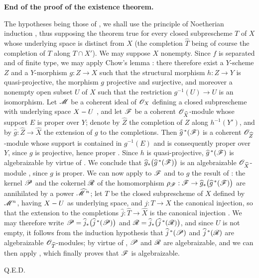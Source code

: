 \begin{env}[5.3.5]
\label{III.5.3.5}
\textbf{End of the proof of the existence theorem.}

The hypotheses being those of , we shall use the
principle of Noetherian induction , thus supposing
the theorem true for every closed subprescheme $T$ of $X$ whose
underlying space is distinct from $X$ (the completion $\widehat{T}$
being of course the completion of $T$ along $T\cap X'$).  We may
suppose $X$ nonempty.  Since $f$ is separated and of finite type, we
may apply Chow's lemma : there therefore exist a
$Y$-scheme $Z$ and a $Y$-morphism $g:Z\to X$ such that the structural
morphism $h:Z\to Y$ is quasi-projective, the morphism $g$ projective
and surjective, and moreover a nonempty open subset $U$ of $X$ such
that the restriction $g^{-1}(U)\to U$ is an isomorphism.  Let $\mathscr{M}$
be a coherent ideal of $\mathscr{O}_X$ defining a closed subprescheme with
underlying space $X- U$ , and let $\mathscr{F}$ be a
coherent $\mathscr{O}_{\widehat{X}}$-module whose support $E$ is proper over
$Y$; denote by $\widehat{Z}$ the completion of $Z$ along $h^{-1}(Y')$,
and by $\widehat{g}:\widehat{Z}\to\widehat{X}$ the extension of $g$ to
the completions.  Then $\widehat{g}^{\,*}(\mathscr{F})$ is a coherent
$\mathscr{O}_{\widehat{Z}}$-module whose support is contained in
$g^{-1}(E)$ and is consequently proper over $Y$, since $g$ is
projective, hence proper .  Since $h$ is
quasi-projective, $\widehat{g}^{\,*}(\mathscr{F})$ is algebraizable by
virtue of .
We conclude that $\widehat{g}_*\bigl(\widehat{g}^{\,*}(\mathscr{F})\bigr)$
is an algebraizable $\mathscr{O}_{\widehat{X}}$-module ,
since $g$ is proper.  We can now apply to $\mathscr{F}$ and to $g$ the
result of : the kernel $\mathscr{P}$ and the cokernel
$\mathscr{R}$ of the homomorphism $\rho_{\mathscr{F}}:\mathscr{F}\to
\widehat{g}_*\bigl(\widehat{g}^{\,*}(\mathscr{F})\bigr)$ are annihilated by
a power $\widehat{\mathscr{M}}^{\,n}$; let $T$ be the closed subprescheme
of $X$ defined by $\mathscr{M}^n$, having $X- U$ as underlying space,
and $j:T\to X$ the canonical injection, so that the extension to the
completions $\widehat{j}:\widehat{T}\to\widehat{X}$ is the canonical
injection .  We may therefore write
$\mathscr{P}=\widehat{j}_*\bigl(\widehat{j}^{\,*}(\mathscr{P})\bigr)$ and
$\mathscr{R}=\widehat{j}_*\bigl(\widehat{j}^{\,*}(\mathscr{R})\bigr)$, and since
$U$ is not empty, it follows from the induction hypothesis that
$\widehat{j}^{\,*}(\mathscr{P})$ and $\widehat{j}^{\,*}(\mathscr{R})$ are
algebraizable $\mathscr{O}_{\widehat{T}}$-modules; by virtue of
, $\mathscr{P}$ and $\mathscr{R}$ are algebraizable, and we can
then apply , which finally proves that $\mathscr{F}$ is
algebraizable.

\hfill Q.E.D.
\end{env}


